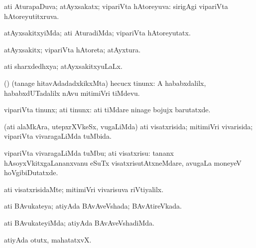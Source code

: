 \bentry
{}
\gl{\gu}
\bmng
ati AturapaDuva; atAyxsakatx; vipariVta hAtoreyuva:  sirigAgi vipariVta hAtoreyutitxruva. 
\emng
\eentry

\bentry
{}
\gl{\kirxvi}
\bmng
atAyxsakitxyiMda; ati AturadiMda; vipariVta hAtoreyutatx. 
\emng
\eentry

\bentry
{}
\gl{\nA}
\bmng
atAyxsakitx; vipariVta hAtoreta; atAyxtura. 
\emng
\eentry

\bentry
{}
\gl{\gu}
\bmng
ati sharxdedhxya; atAyxsakitxyuLaLx. 
\emng
\eentry

\bentry
{}
\gl{\kirx}
\bmng
\emng

\noindent
\gl{\sakirx}
\bmng
(\AtAmx) (tanage hitavAdadadxkikxMta) hecucx tinunx:  A hababxdalilx, hababxdUTadalilx nAvu mitimiVri tiMdevu. 
\emng

\noindent
\gl{\akirx}
\bmng
vipariVta tinunx; ati tinunx:  ati tiMdare ninage bojujx barutatxde. 
\emng
\eentry

\bentry
{}
\gl{\gu}
\bmng
(ati alaMkAra, utepxrXVkeSx, \mo vugaLiMda) ati visatxrisida; mitimiVri vivarisida; vipariVta vivaragaLiMda tuMbida. 
\emng
\eentry

\bentry
{}
\gl{\sakirx}
\bmng
vipariVta vivaragaLiMda tuMbu; ati visatxrisu:  tananx hAsoyxVkitxgaLananxvanu eSuTx visatxrisutAtxneMdare, avugaLa moneyeV hoVgibiDutatxde. 
\emng
\eentry

\bentry
{}
\gl{\kirxvi}
\bmng
ati visatxrisidaMte; mitimiVri vivarisuva riVtiyalilx. 
\emng
\eentry

\bentry
{}
\gl{\gu}
\bmng
ati BAvukateya; atiyAda BAvAveVshada; BAvAtireVkada. 
\emng
\eentry

\bentry
{}
\gl{\kirxvi}
\bmng
ati BAvukateyiMda; atiyAda BAvAveVshadiMda. 
\emng
\eentry

\bentry
{}
\gl{\nA}
\bmng
atiyAda otutx, mahatatxvX. 
\emng
\eentry

